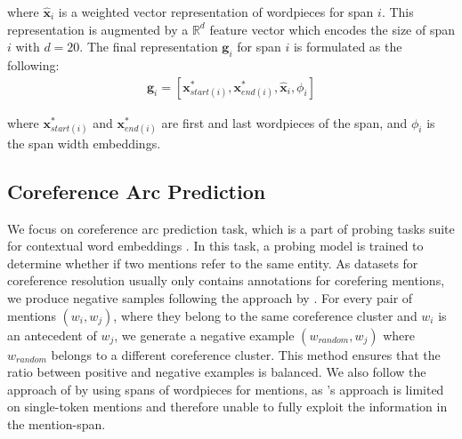 \documentclass[11pt]{article}
\begin{document}
where $\hat{\pmb{x}}_{i}$ is a weighted vector representation of wordpieces for span $i$. This representation is augmented by a $\mathbb{R}^{d}$ feature vector which encodes the size of span $i$ with $d = 20$. The final representation $\pmb{g}_{i}$ for span $i$ is formulated as the following:
\begin{align}
\pmb{g}_{i} = [\pmb{x}_{start(i)}^{*}, \pmb{x}_{end(i)}^{*}, \hat{\pmb{x}}_{i}, \phi_{i}]
\end{align}  

where $\pmb{x}_{start(i)}^{*}$ and $\pmb{x}_{end(i)}^{*}$ are first and last wordpieces of the span, and $\phi_{i}$ is the span width embeddings.

\subsection{Coreference Arc Prediction}
\label{subsection:corefarc}



We focus on coreference arc prediction task, which is a part of probing tasks suite for contextual word embeddings \parencite{liu2019linguistic, tenney2019context}. In this task, a probing model is trained to determine whether if two mentions refer to the same entity. As datasets for coreference resolution usually only contains annotations for corefering mentions, we produce negative samples following the approach by \parencite{liu2019linguistic}. For every pair of mentions $(w_{i}, w_{j})$, where they belong to the same coreference cluster and $w_{i}$ is an antecedent of $w_{j}$, we generate a negative example $(w_{random}, w_{j})$ where $w_{random}$ belongs to a different coreference cluster. This method ensures that the ratio between positive and negative examples is balanced. We also follow the approach of \parencite{tenney2019context} by using spans of wordpieces for mentions, as \parencite{liu2019linguistic}'s approach is limited on single-token mentions and therefore unable to fully exploit the information in the mention-span.
\end{document}
